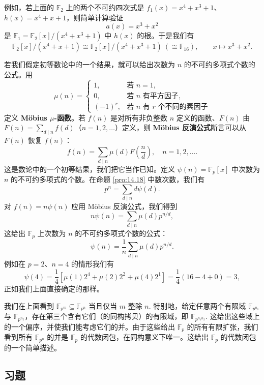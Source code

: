 例如，若上面的 \(\mathbb{F}_2\) 上的两个不可约四次式是 \(f_1(x) = x^4+x^3+1\)、\(h(x) = x^4+x+1\)，则简单计算验证
\[
a(x) = x^3+x^2
\]
是 \(\mathbb{F}_1 = \mathbb{F}_2[x]/(x^4+x^3+1)\) 中 \(h(x)\) 的根。于是我们有
\[
\mathbb{F}_2[x]/(x^4+x+1) \cong \mathbb{F}_2[x]/(x^4+x^3+1)\ (\cong \mathbb{F}_{16}), \qquad x \mapsto x^3+x^2.
\]

若我们假定初等数论中的一个结果，就可以给出次数为 \(n\) 的不可约多项式个数的公式。用
\[
\mu(n) = \begin{cases} 1, & \text{若 } n = 1, \\ 0, & \text{若 } n \text{ 有平方因子}, \\ (-1)^r, & \text{若 } n \text{ 有 } r \text{ 个不同的素因子} \end{cases}
\]
定义 \textbf{Möbius \(\mu\)-函数}。若 \(f(n)\) 是对所有非负整数 \(n\) 定义的函数、\(F(n)\) 由 \(F(n) = \sum_{d \mid n}f(d)\)（\(n = 1, 2, \ldots\)）定义，则 \textbf{Möbius 反演公式}断言可以从 \(F(n)\) 恢复 \(f(n)\)：
\[
f(n) = \sum_{d \mid n}\mu(d)F\left(\frac{n}{d}\right), \quad n = 1, 2, \ldots.
\]
这是数论中的一个初等结果，我们把它当作已知。定义 \(\psi(n) = \mathbb{F}_p[x]\) 中次数为 \(n\) 的不可约多项式的个数。在命题 \ref{pro:14.18} 中数次数，我们有
\[
p^n = \sum_{d \mid n}d\psi(d).
\]
对 \(f(n) = n\psi(n)\) 应用 Möbius 反演公式，我们得到
\[
n\psi(n) = \sum_{d \mid n}\mu(d)p^{n/d},
\]
这给出 \(\mathbb{F}_p\) 上次数为 \(n\) 的不可约多项式个数的公式：
\[
\psi(n) = \frac{1}{n}\sum_{d \mid n}\mu(d)p^{n/d}.
\]
例如在 \(p = 2\)、\(n = 4\) 的情形我们有
\[
\psi(4) = \frac{1}{4}[\mu(1)2^4+\mu(2)2^2+\mu(4)2^1] = \frac{1}{4}(16-4+0) = 3,
\]
正如我们上面直接确定的那样。

我们在上面看到 \(\mathbb{F}_{p^m} \subseteq \mathbb{F}_{p^n}\) 当且仅当 \(m\) 整除 \(n\). 特别地，给定任意两个有限域 \(\mathbb{F}_{p^{n_1}}\) 与 \(\mathbb{F}_{p^{n_2}}\)，存在第三个含有它们（的同构拷贝）的有限域，即 \(\mathbb{F}_{p^{n_1n_2}}\). 这给出这些域上的一个偏序，并使我们能考虑它们的并。由于这些给出 \(\mathbb{F}_p\) 的所有有限扩张，我们看到所有 \(\mathbb{F}_{p^n}\) 的并是 \(\mathbb{F}_p\) 的代数闭包，在同构意义下唯一。这给出 \(\mathbb{F}_p\) 的代数闭包的一个简单描述。

\subsection*{习题}

